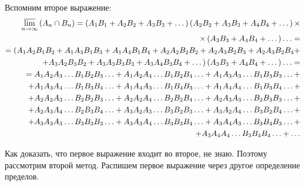 \documentclass{book}
\begin{document}
Вспомним второе выражение:
\begin{equation*}
\begin{split}
\varlimsup \limits_{ n \to \infty } \left( A_n \cap B_n \right) =
\left( A_1 B_1 + A_2 B_2 + A_3 B_3 + \dotsc \right) \left( A_2 B_2 + A_3 B_3 + A_4 B_4 + \dotsc \right) \times \\
\times \left(A_3 B_3 + A_4 B_4 + \dotsc \right) \dotsc = \\
= ( A_1 A_2 B_1 B_2 + A_1 A_3 B_1 B_3 + A_1 A_4 B_1 B_4 + A_2 A_2 B_2 B_2 + A_2 A_3 B_2 B_3 + A_2 A_3 B_2 B_4 + \\
+ A_3 A_2 B_3 B_2 + A_3 A_3 B_3 B_3 + A_3 A_4 B_3 B_4 + \dotsc) \left(A_3 B_3 + A_4 B_4 + \dotsc  \right) \dotsc = \\
= A_1 A_2 A_3 \dotsc B_1 B_2 B_3 \dotsc + A_1 A_2 A_4 \dotsc B_1 B_2 B_4 \dotsc + A_1 A_3 A_3 \dotsc B_1 B_3 B_3 \dotsc + \\
+ A_1 A_3 A_4 \dotsc B_1 B_3 B_4 \dotsc + A_1 A_4 A_3 \dotsc B_1 B_4 B_3 \dotsc + A_1 A_4 A_4 \dotsc B_1 B_3 B_4 \dotsc + \\
+ A_2 A_2 A_3 \dotsc B_2 B_2 B_3 \dotsc + A_2 A_2 A_4 \dotsc B_2 B_2 B_4 \dotsc + A_2 A_3 A_3 \dotsc B_2 B_3 B_3 \dotsc + \\
+ A_2 A_3 A_4 \dotsc B_2 B_3 B_4 \dotsc + A_3 A_2 A_3 \dotsc B_3 B_2 B_3 \dotsc + A_3 A_2 A_4 \dotsc B_3 B_2 B_4 \dotsc + \\
+ A_3 A_3 A_3 \dotsc B_3 B_3 B_3 \dotsc + A_3 A_3 A_4 \dotsc B_3 B_3 B_4 \dotsc + A_3 A_4 A_3 \dotsc B_3 B_4 B_3 \dotsc + \\
+ A_3 A_4 A_4 \dotsc B_3 B_4 B_4 \dotsc + \dotsc
\end{split}
\end{equation*}

Как доказать, что первое выражение входит во второе, не знаю. Поэтому рассмотрим второй метод. Распишем первое выражение через другое определение пределов.
\end{document}
